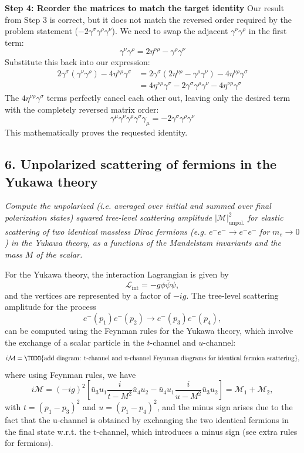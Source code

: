 \textbf{Step 4: Reorder the matrices to match the target identity}
Our result from Step 3 is correct, but it does not match the reversed order required by the problem statement ($-2\gamma^\sigma \gamma^\rho \gamma^\nu$). We need to swap the adjacent $\gamma^\nu \gamma^\rho$ in the first term:
\[
    \gamma^\nu \gamma^\rho = 2\eta^{\nu\rho} - \gamma^\rho \gamma^\nu
\]
Substitute this back into our expression:
\[
    \begin{aligned}
        2\gamma^\sigma (\gamma^\nu \gamma^\rho) - 4\eta^{\nu\rho} \gamma^\sigma & = 2\gamma^\sigma (2\eta^{\nu\rho} - \gamma^\rho \gamma^\nu) - 4\eta^{\nu\rho} \gamma^\sigma             \\
                                                                                & = 4\eta^{\nu\rho} \gamma^\sigma - 2\gamma^\sigma \gamma^\rho \gamma^\nu - 4\eta^{\nu\rho} \gamma^\sigma
    \end{aligned}
\]
The $4\eta^{\nu\rho} \gamma^\sigma$ terms perfectly cancel each other out, leaving only the desired term with the completely reversed matrix order:
\[
    \gamma^\mu \gamma^\nu \gamma^\rho \gamma^\sigma \gamma_\mu = -2\gamma^\sigma \gamma^\rho \gamma^\nu
\]
This mathematically proves the requested identity.


\subsection*{6. Unpolarized scattering of fermions in the Yukawa theory}

\begin{center}
    \textit{Compute the unpolarized (i.e. averaged over initial and summed over final polarization states) squared tree-level scattering amplitude} \(\vert \mathcal{M} \vert^2_{\text{unpol.}}\) \textit{for elastic scattering of two identical massless Dirac fermions (e.g.} \(e^- e^- \to e^- e^-\) \textit{for} \(m_e \to 0\)\textit{) in the Yukawa theory, as a functions of the Mandelstam invariants and the mass} \(M\) \textit{of the scalar.}
\end{center}

For the Yukawa theory, the interaction Lagrangian is given by
\[
    \mathcal{L}_{\text{int}} = -g \phi \bar{\psi} \psi,
\]
and the vertices are represented by a factor of \(-ig\). The tree-level scattering amplitude for the process
\[
    e^-(p_1) e^-(p_2) \to e^-(p_3) e^-(p_4),
\]
can be computed using the Feynman rules for the Yukawa theory, which involve the exchange of a scalar particle in the \(t\)-channel and \(u\)-channel:
\[
    i \mathcal{M} = \text{\TODO{add diagram: t-channel and u-channel Feynman diagrams for identical fermion scattering}},
\]
where using Feynman rules, we have
\[
    i \mathcal{M} = (-ig)^2 \left[ \bar{u}_3 u_1 \frac{i}{t - M^2} \bar{u}_4 u_2 - \bar{u}_4 u_1 \frac{i}{u - M^2} \bar{u}_3 u_2 \right] = \mathcal{M}_1 + \mathcal{M}_2,
\]
with \(t = (p_1 - p_3)^2\) and \(u = (p_1 - p_4)^2\), and the minus sign arises due to the fact that the u-channel is obtained by exchanging the two identical fermions in the final state w.r.t. the t-channel, which introduces a minus sign (see extra rules for fermions).

